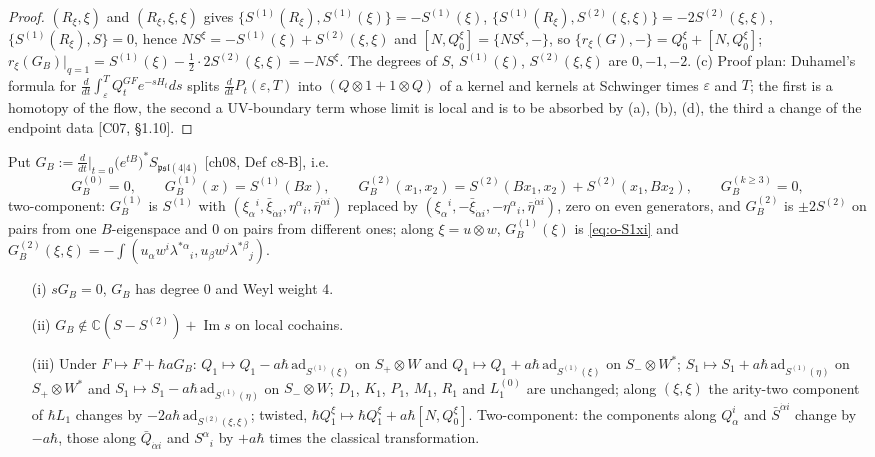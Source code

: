 \begin{proof}
$(R_\xi,\xi)$ and $(R_\xi,\xi,\xi)$ gives $\{S^{(1)}(R_\xi),S^{(1)}(\xi)\}=-S^{(1)}(\xi)$, $\{S^{(1)}(R_\xi),S^{(2)}(\xi,\xi)\}=-2S^{(2)}(\xi,\xi)$, $\{S^{(1)}(R_\xi),S\}=0$, hence $NS^\xi=-S^{(1)}(\xi)+S^{(2)}(\xi,\xi)$ and $[N,Q^\xi_0]=\{NS^\xi,-\}$, so $\{r_\xi(G),-\}=Q^\xi_0+[N,Q^\xi_0]$; $r_\xi(G_B)|_{q=1}=S^{(1)}(\xi)-\tfrac12\cdot2S^{(2)}(\xi,\xi)=-NS^\xi$. The degrees of $S$, $S^{(1)}(\xi)$, $S^{(2)}(\xi,\xi)$ are $0,-1,-2$. (c) Proof plan: Duhamel's formula for $\frac{d}{dt}\int_\varepsilon^TQ^{GF}_te^{-sH_t}ds$ splits $\frac{d}{dt}P_t(\varepsilon,T)$ into $(Q\otimes1+1\otimes Q)$ of a kernel and kernels at Schwinger times $\varepsilon$ and $T$; the first is a homotopy of the flow, the second a UV-boundary term whose limit is local and is to be absorbed by (a), (b), (d), the third a change of the endpoint data [C07, §1.10].
\end{proof}

\begin{proposition}
\label{prop:o-GB}
Put $G_B:=\frac{d}{dt}\big|_{t=0}\big(e^{tB}\big)^*S_{\mathfrak{psl}(4|4)}$ [ch08, Def c8-B], i.e.
\[
G_B^{(0)}=0,\qquad G_B^{(1)}(x)=S^{(1)}(Bx),\qquad G_B^{(2)}(x_1,x_2)=S^{(2)}(Bx_1,x_2)+S^{(2)}(x_1,Bx_2),\qquad G_B^{(k\ge3)}=0,
\]
two-component: $G_B^{(1)}$ is $S^{(1)}$ with $(\xi_\alpha{}^i,\bar\xi_{\dot\alpha i},\eta^\alpha{}_i,\bar\eta^{\dot\alpha i})$ replaced by $(\xi_\alpha{}^i,-\bar\xi_{\dot\alpha i},-\eta^\alpha{}_i,\bar\eta^{\dot\alpha i})$, zero on even generators, and $G_B^{(2)}$ is $\pm2S^{(2)}$ on pairs from one $B$-eigenspace and $0$ on pairs from different ones; along $\xi=u\otimes w$, $G_B^{(1)}(\xi)$ is \eqref{eq:o-S1xi} and $G_B^{(2)}(\xi,\xi)=-\int(u_\alpha w^i\lambda^{*\alpha}{}_i,u_\beta w^j\lambda^{*\beta}{}_j)$.
\begin{itemize}
\item[(i)] $sG_B=0$, $G_B$ has degree $0$ and Weyl weight $4$.
\item[(ii)] $G_B\notin\mathbb C(S-S^{(2)})+\operatorname{Im}s$ on local cochains.
\item[(iii)] Under $F\mapsto F+\hbar aG_B$: $Q_1\mapsto Q_1-a\hbar\,\mathrm{ad}_{S^{(1)}(\xi)}$ on $S_+\otimes W$ and $Q_1\mapsto Q_1+a\hbar\,\mathrm{ad}_{S^{(1)}(\xi)}$ on $S_-\otimes W^*$; $S_1\mapsto S_1+a\hbar\,\mathrm{ad}_{S^{(1)}(\eta)}$ on $S_+\otimes W^*$ and $S_1\mapsto S_1-a\hbar\,\mathrm{ad}_{S^{(1)}(\eta)}$ on $S_-\otimes W$; $D_1$, $K_1$, $P_1$, $M_1$, $R_1$ and $L_1^{(0)}$ are unchanged; along $(\xi,\xi)$ the arity-two component of $\hbar L_1$ changes by $-2a\hbar\,\mathrm{ad}_{S^{(2)}(\xi,\xi)}$; twisted, $\hbar Q^\xi_1\mapsto\hbar Q^\xi_1+a\hbar[N,Q^\xi_0]$. Two-component: the components along $Q^i_\alpha$ and $\bar S^{\dot\alpha i}$ change by $-a\hbar$, those along $\bar Q_{\dot\alpha i}$ and $S^\alpha{}_i$ by $+a\hbar$ times the classical transformation.
\end{itemize}
\end{proposition}


